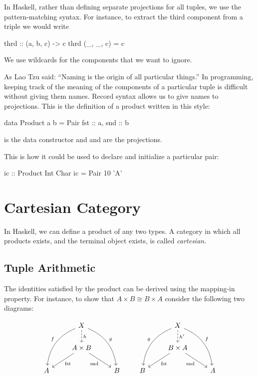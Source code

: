 \documentclass[DaoFP]{subfiles}
\begin{document}
In Haskell, rather than defining separate projections for all tuples, we use the pattern-matching syntax. For instance, to extract the third component from a triple we would write

\begin{haskell}
thrd :: (a, b, c) -> c
thrd (_, _, c) = c
\end{haskell}
We use wildcards for the components that we want to ignore.

As Lao Tzu said: ``Naming is the origin of all particular things.'' In programming, keeping track of the meaning of the components of a particular tuple is difficult without giving them names. Record syntax allows us to give names to projections. This is the definition of a product written in this style:
\begin{haskell}
data Product a b = Pair { fst :: a, snd :: b }
\end{haskell}
 is the data constructor and  and  are the projections. 

This is how it could be used to declare and initialize a particular pair:
\begin{haskell}
ic :: Product Int Char
ic = Pair 10 'A'
\end{haskell}

\section{Cartesian Category}

In Haskell, we can define a product of any two types. A category in which all products exists, and the terminal object exists, is called \emph{cartesian}. 

\subsection{Tuple Arithmetic}

The identities satisfied by the product can be derived using the mapping-in property. For instance, to show that $A \times B \cong B \times A$ consider the following two diagrams:

\[
 \begin{tikzcd}
 &X
 \arrow[d, dashed, "h"]
 \arrow[ddl, bend right, "f"']
 \arrow[ddr, bend left, "g"]
 \\
 & A \times B
  \arrow[dl,  "\text{fst}"]
 \arrow[dr,   "\text{snd}"']
 \\
A && B
 \end{tikzcd}
 \qquad
 \begin{tikzcd}
 &X
 \arrow[d, dashed, "h'"]
 \arrow[ddl, bend right, "g"']
 \arrow[ddr, bend left, "f"]
 \\
 & B \times A
  \arrow[dl,  "\text{fst}"]
 \arrow[dr,   "\text{snd}"']
\\
B && A
  \end{tikzcd}
\]
\end{document}
